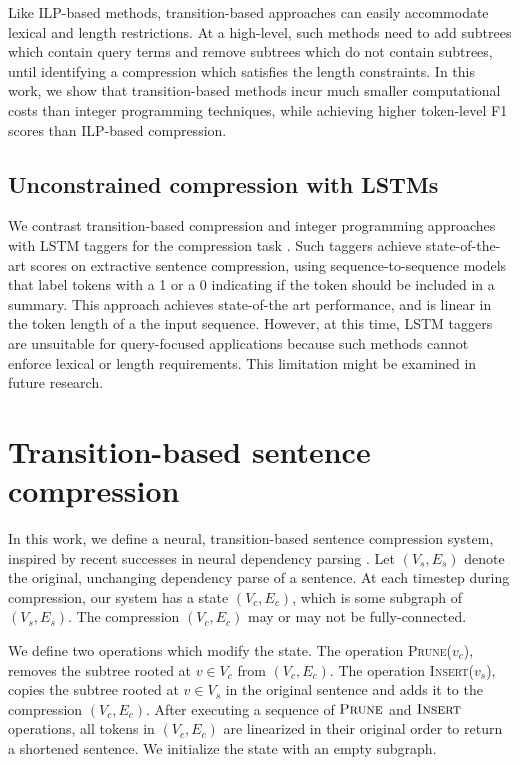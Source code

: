 \documentclass[11pt,a4paper]{article}
\begin{document}
Like ILP-based methods, transition-based approaches can easily accommodate lexical and length restrictions. At a high-level, such methods need to add subtrees which contain query terms and remove subtrees which do not contain subtrees, until identifying a compression which satisfies the length constraints. In this work, we show that transition-based methods incur much smaller computational costs than integer programming techniques, while achieving higher token-level F1 scores than ILP-based compression.

\subsection{Unconstrained compression with LSTMs}

We contrast transition-based compression and integer programming approaches with LSTM taggers for the compression task \cite{filippova2015sentence}. Such taggers achieve state-of-the-art scores on extractive sentence compression, using sequence-to-sequence models that label tokens with a 1 or a 0 indicating if the token should be included in a summary. This approach achieves state-of-the art performance, and is linear in the token length of a the input sequence. However, at this time, LSTM taggers are unsuitable for query-focused applications because such methods cannot enforce lexical or length requirements. This limitation might be examined in future research.

\section{Transition-based sentence compression}\label{s:system}

In this work, we define a neural, transition-based sentence compression system, inspired by recent successes in neural dependency parsing \cite{D14-1082}. Let ${(V_s,E_s)}$ denote the original, unchanging dependency parse of a sentence. At each timestep during compression, our system has a state ${(V_c,E_c)}$, which is some subgraph of ${(V_s,E_s)}$. The compression ${(V_c,E_c)}$ may or may not be fully-connected. 

We define two operations which modify the state. The operation \textsc{Prune}($v_c$), removes the subtree rooted at $v \in V_c$ from ${(V_c,E_c)}$. The operation \textsc{Insert}($v_s$), copies the subtree rooted at $v \in V_s$ in the original sentence and adds it to the compression ${(V_c,E_c)}$. After executing a sequence of $\textsc{Prune}$ and $\textsc{Insert}$ operations, all tokens in ${(V_c,E_c)}$ are linearized in their original order to return a shortened sentence. We initialize the state with an empty subgraph. 
\end{document}
